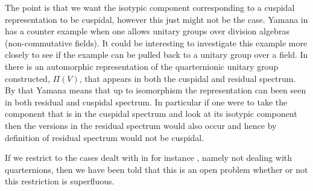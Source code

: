 The point is that we want the isotypic component corresponding to a cuspidal representation to be cuspidal, however this just might not be the case. 
Yamana in \cite[Rm. 7.12]{yamanaSiegelWeilFormulaQuaternionic2013} has a counter example when one allows unitary groups over division algebras (non-commutative fields). It could be interesting to investigate this example more closely to see if the example can be pulled back to a unitary group over a field. In \cite{yamanaSiegelWeilFormulaQuaternionic2013} there is an automorphic representation of the quarternionic unitary group constructed, \(\Pi(V)\), that appears in both the cuspidal and residual spectrum. By that Yamana means that up to isomorphism the representation can been seen in both residual and cuspidal spectrum. In particular if one were to take the component that is in the cuspidal spectrum and look at its isotypic component then the versions in the residual spectrum would also occur and hence by definition of residual spectrum would not be cuspidal.

If we restrict to the cases dealt with in for instance \cite{moeglinSpectralDecompositionEisenstein1995}, namely not dealing with quarternions, then we have been told that this is an open problem whether or not this restriction is superfluous. 




